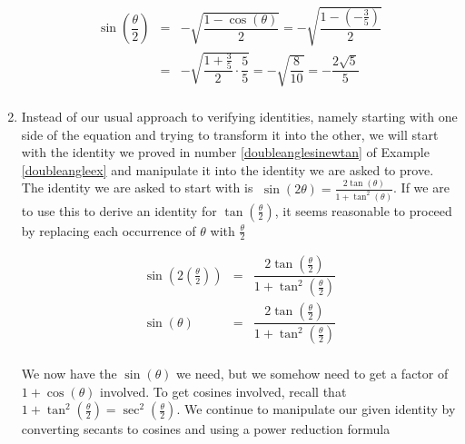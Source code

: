 \begin{ex}
\begin{enumerate}
\[ \begin{array}{rcl}

\sin\left(\dfrac{\theta}{2} \right) & = &  -\sqrt{\dfrac{1-\cos\left(\theta \right)}{2}} = -\sqrt{\dfrac{1- \left(-\frac{3}{5}\right)}{2}}\\ [10pt]
                          	& = & -\sqrt{\dfrac{1 + \frac{3}{5}}{2} \cdot \dfrac{5}{5}} = -\sqrt{\dfrac{8}{10}} =  -\dfrac{2\sqrt{5}}{5}\\
\end{array}\]

\item  Instead of our usual approach to verifying identities, namely starting with one side of the equation and trying to transform it into the other, we will start with the identity we proved in number \ref{doubleanglesinewtan} of Example \ref{doubleangleex} and manipulate it into the identity we are asked to prove.  The identity we are asked to start with is $\; \sin(2\theta) = \frac{2\tan(\theta)}{1 + \tan^{2}(\theta)}$.  If we are to use this to derive an identity for $\tan\left(\frac{\theta}{2}\right)$, it seems reasonable to proceed by replacing each occurrence of $\theta$ with $\frac{\theta}{2}$

\vspace{-.1in}

\[ \begin{array}{rcl} 

\sin\left(2 \left(\frac{\theta}{2}\right)\right) & = &  \dfrac{2\tan\left(\frac{\theta}{2}\right)}{1 + \tan^{2}\left(\frac{\theta}{2}\right)} \\ [15pt]
\sin(\theta) & = & \dfrac{2\tan\left(\frac{\theta}{2}\right)}{1 + \tan^{2}\left(\frac{\theta}{2}\right)} \\ \end{array} \]

We now have the $\sin(\theta)$ we need, but we somehow need to get a factor of $1+\cos(\theta)$ involved.  To get cosines involved, recall that $1 + \tan^{2}\left(\frac{\theta}{2}\right) = \sec^{2}\left(\frac{\theta}{2}\right)$.  We continue to manipulate our given identity by converting secants to cosines and using a power reduction formula

\[ \begin{array}{rcl} 


\end{array}\]
\end{enumerate}
\end{ex}
